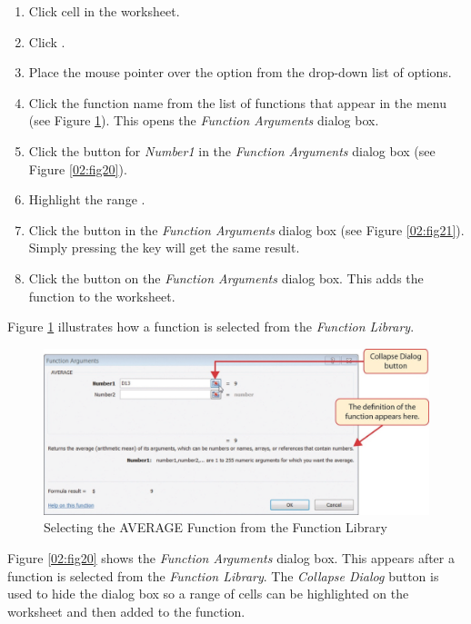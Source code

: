 \begin{enumerate}
	\item Click cell  in the  worksheet.
	\item Click .
	\item Place the mouse pointer over the  option from the drop-down list of options.
	\item Click the  function name from the list of functions that appear in the menu (see Figure \ref{02:fig19}). This opens the \textit{Function Arguments} dialog box.
	\item Click the  button for \textit{Number1} in the \textit{Function Arguments} dialog box (see Figure \ref{02:fig20}).
	\item Highlight the range .
	\item Click the  button in the \textit{Function Arguments} dialog box (see Figure \ref{02:fig21}). Simply pressing the  key will get the same result.
	\item Click the  button on the \textit{Function Arguments} dialog box. This adds the  function to the worksheet.
\end{enumerate}

Figure \ref{02:fig19} illustrates how a function is selected from the  \textit{Function Library}.

\begin{figure}[H]
	\centering
	\includegraphics[width=\maxwidth{.95\linewidth}]{gfx/ch02_fig19}
	\caption{Selecting the AVERAGE Function from the Function Library}
	\label{02:fig19}
\end{figure}

Figure \ref{02:fig20} shows the \textit{Function Arguments} dialog box. This appears after a function is selected from the \textit{Function Library}. The \textit{Collapse Dialog} button is used to hide the dialog box so a range of cells can be highlighted on the worksheet and then added to the function.

